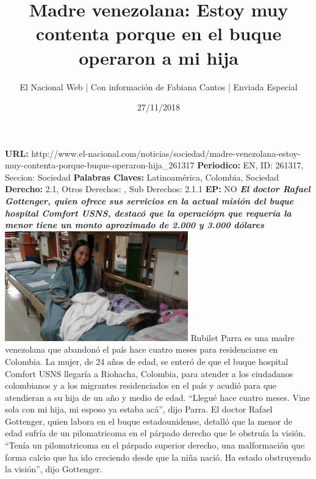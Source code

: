 \documentclass{article}%
\title{\textbf{Madre venezolana: Estoy muy contenta porque en el buque operaron a mi hija}}%
\author{El Nacional Web | Con información de Fabiana Cantos | Enviada Especial}%
\date{27/11/2018}%
\begin{document}
%
\normalsize%
\maketitle%
\textbf{URL: }%
http://www.el{-}nacional.com/noticias/sociedad/madre{-}venezolana{-}estoy{-}muy{-}contenta{-}porque{-}buque{-}operaron{-}hija\_261317\newline%
%
\textbf{Periodico: }%
EN, %
ID: %
261317, %
Seccion: %
Sociedad\newline%
%
\textbf{Palabras Claves: }%
Latinoamérica, Colombia, Sociedad\newline%
%
\textbf{Derecho: }%
2.1, %
Otros Derechos: %
, %
Sub Derechos: %
2.1.1\newline%
%
\textbf{EP: }%
NO\newline%
\newline%
%
\textbf{\textit{El doctor Rafael Gottenger, quien ofrece sus servicios en la actual misión del buque hospital Comfort USNS, destacó que la operaciópn que requería la menor tiene un monto aproximado de 2.000 y 3.000 dólares~}}%
\newline%
\newline%
%
\includegraphics[width=300px]{25.jpg}%
\newline%
%
Rubilet Parra es una madre venezolana que abandonó el país hace cuatro meses para residenciarse en Colombia. La mujer, de 24 años de edad, se enteró de que el buque hospital Comfort USNS llegaría a Riohacha, Colombia, para atender a los ciudadanos colombianos y a los migrantes residenciados en el país y acudió para que atendieran a su hija de un año y medio de edad.%
\newline%
%
“Llegué hace cuatro meses. Vine sola con mi hija, mi esposo ya estaba acá”, dijo Parra.%
\newline%
%
El doctor Rafael Gottenger, quien labora en el buque estadounidense, detalló que la menor de edad sufría de un pilomatricoma en el párpado derecho que le obstruía la visión.%
\newline%
%
“Tenía un pilomatricoma en el párpado superior derecho, una malformación que forma calcio que ha ido creciendo desde que la niña nació. Ha estado obstruyendo la visión”, dijo Gottenger.%
\end{document}
